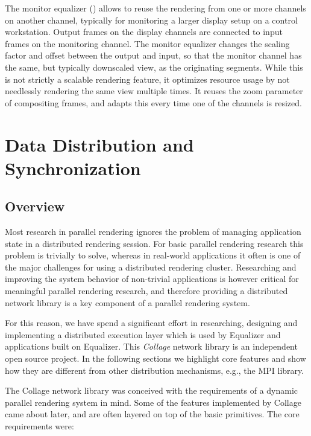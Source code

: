 The monitor equalizer () allows to reuse the rendering from one
or more channels on another channel, typically for monitoring a larger display
setup on a control workstation. Output frames on the display channels are
connected to input frames on the monitoring channel. The monitor equalizer
changes the scaling factor and offset between the output and input, so that the
monitor channel has the same, but typically downscaled view, as the originating
segments. While this is not strictly a scalable rendering feature, it optimizes
resource usage by not needlessly rendering the same view multiple times. It reuses the zoom parameter of compositing frames, and adapts this every time one of the channels is resized.


\chapter{Data Distribution and Synchronization}\label{sCollage}

\section{Overview}

Most research in parallel rendering ignores the problem of managing application
state in a distributed rendering session. For basic parallel rendering research
this problem is trivially to solve, whereas in real-world applications it often
is one of the major challenges for using a distributed rendering cluster.
Researching and improving the system behavior of non-trivial applications is
however critical for meaningful parallel rendering research, and therefore
providing a distributed network library is a key component of a parallel
rendering system.

For this reason, we have spend a significant effort in researching, designing
and implementing a distributed execution layer which is used by Equalizer and
applications built on Equalizer. This {\em Collage} network library is an
independent open source project. In the following sections we highlight core
features and show how they are different from other distribution mechanisms,
e.g., the MPI library.

The Collage network library was conceived with the requirements of a dynamic
parallel rendering system in mind. Some of the features implemented by Collage
came about later, and are often layered on top of the basic primitives. The core
requirements were:

